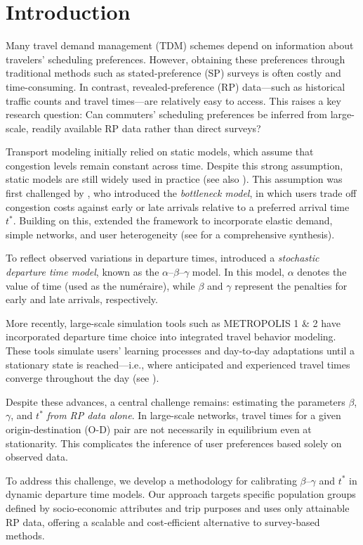 \section{Introduction}

 
Many travel demand management (TDM) schemes depend on information about travelers’ scheduling preferences. However, obtaining these preferences through traditional methods such as stated-preference (SP) surveys is often costly and time-consuming. In contrast, revealed-preference (RP) data—such as historical traffic counts and travel times—are relatively easy to access. This raises a key research question: Can commuters’ scheduling preferences be inferred from large-scale, readily available RP data rather than direct surveys?

Transport modeling initially relied on static models, which assume that congestion levels remain constant across time. Despite this strong assumption, static models are still widely used in practice (see also \citealp{duranton2011fundamental}). This assumption was first challenged by \citet{Vickrey1963, Vickrey1969}, who introduced the \textit{bottleneck model}, in which users trade off congestion costs against early or late arrivals relative to a preferred arrival time \( t^* \). Building on this, \citet{arnott1993structural} extended the framework to incorporate elastic demand, simple networks, and user heterogeneity (see \citealp{Li2020} for a comprehensive synthesis).

To reflect observed variations in departure times, \citet{de1983stochastic} introduced a \textit{stochastic departure time model}, known as the \(\alpha\)–\(\beta\)–\(\gamma\) model. In this model, \(\alpha\) denotes the value of time (used as the numéraire), while \(\beta\) and \(\gamma\) represent the penalties for early and late arrivals, respectively.

More recently, large-scale simulation tools such as METROPOLIS 1 \& 2 have incorporated departure time choice into integrated travel behavior modeling. These tools simulate users' learning processes and day-to-day adaptations until a stationary state is reached—i.e., where anticipated and experienced travel times converge throughout the day (see \citealp{javaudin2024metropolis2}).

Despite these advances, a central challenge remains: estimating the parameters \(\beta\), \(\gamma\), and \( t^* \) \textit{from RP data alone}. In large-scale networks, travel times for a given origin-destination (O-D) pair are not necessarily in equilibrium even at stationarity. This complicates the inference of user preferences based solely on observed data.

To address this challenge, we develop a methodology for calibrating \(\beta\)–\(\gamma\) and \( t^* \) in dynamic departure time models. Our approach targets specific population groups defined by socio-economic attributes and trip purposes and uses only attainable RP data, offering a scalable and cost-efficient alternative to survey-based methods.